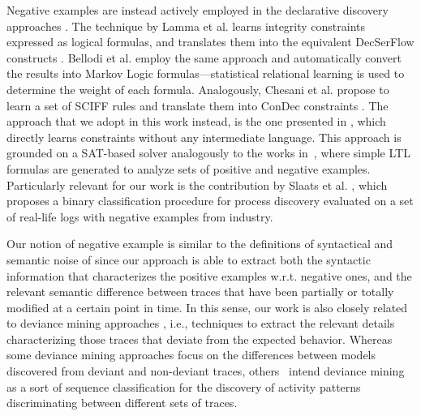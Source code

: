 Negative examples are instead actively employed in the declarative discovery approaches \cite{2007-Lamma,2007b-Lamma,2010-Bellodi,2016-Bellodi,2009-Chesani,deviant-tkde,DBLP:conf/bpm/SlaatsDB21}. 
The technique by Lamma et al. \cite{2007-Lamma,2007b-Lamma} learns integrity constraints expressed as logical formulas, and translates them into the equivalent DecSerFlow constructs \cite{2006-Aalst}. 
Bellodi et al. \cite{2010-Bellodi,2016-Bellodi} employ the same approach and automatically convert the results into Markov Logic formulas---statistical relational learning is used to determine the weight of each formula.
Analogously, Chesani et al. \cite{2009-Chesani} propose to learn a set of SCIFF rules \cite{2008-Alberti} and translate them into ConDec constraints \cite{2006-Pesic}. The approach that we adopt in this work instead, is the one presented in \cite{deviant-tkde}, which directly learns \declare constraints without any intermediate language.
This approach is grounded on a SAT-based solver analogously to the works in~\cite{2018-Neider,2019-Camacho,2019-Riener}, where simple \ac{LTL} formulas are generated to analyze sets of positive and negative examples.
Particularly relevant for our work is the contribution by Slaats et al. \cite{DBLP:conf/bpm/SlaatsDB21}, which proposes a binary classification procedure for process discovery  evaluated on a set of real-life logs with negative examples from industry. 


Our notion of negative example is similar to the definitions of syntactical and semantic noise of \cite{2009-Gunther} since our approach is able to extract both the syntactic information that characterizes the positive examples w.r.t. negative ones, and the relevant semantic difference between traces that have been partially or totally modified at a certain point in time.
%
In this sense, our work is also closely related to deviance mining approaches \cite{2016-Nguyen}, i.e., techniques to extract the relevant details characterizing those traces %
that deviate from the expected behavior. Whereas some deviance mining approaches \cite{2014-Suriadi,2014-Armas} focus on the differences between models discovered from deviant and non-deviant traces, others~\cite{2013-Suriadi,2015-Partington,2013-Bose,2007-Lo,DBLP:journals/corr/abs-2111-12454} intend deviance mining as a sort of sequence classification for the discovery of activity patterns discriminating between different sets of traces. %

